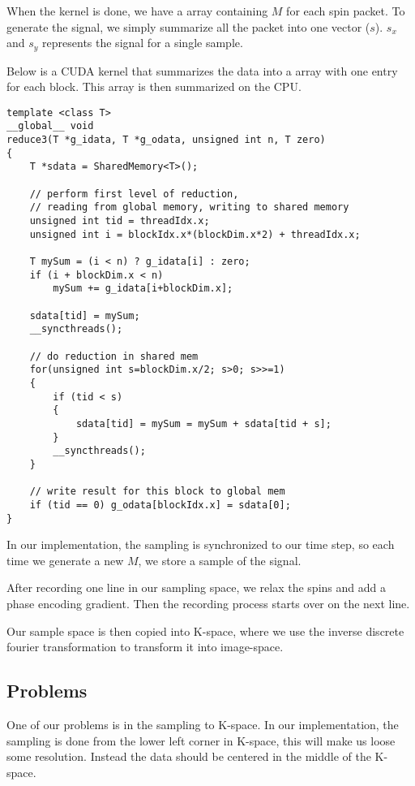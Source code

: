 When the kernel is done, we have a array containing $M$ for each spin
packet. To generate the signal, we simply summarize all the packet
into one vector ($s$). $s_x$ and $s_y$ represents the signal for a
single sample.

Below is a CUDA kernel that summarizes the data into a array with one
entry for each block. This array is then summarized on the CPU.

\begin{strip}
\begin{lstlisting}
template <class T>
__global__ void
reduce3(T *g_idata, T *g_odata, unsigned int n, T zero)
{
    T *sdata = SharedMemory<T>();

    // perform first level of reduction,
    // reading from global memory, writing to shared memory
    unsigned int tid = threadIdx.x;
    unsigned int i = blockIdx.x*(blockDim.x*2) + threadIdx.x;

    T mySum = (i < n) ? g_idata[i] : zero;
    if (i + blockDim.x < n) 
        mySum += g_idata[i+blockDim.x];  

    sdata[tid] = mySum;
    __syncthreads();

    // do reduction in shared mem
    for(unsigned int s=blockDim.x/2; s>0; s>>=1) 
    {
        if (tid < s) 
        {
            sdata[tid] = mySum = mySum + sdata[tid + s];
        }
        __syncthreads();
    }

    // write result for this block to global mem 
    if (tid == 0) g_odata[blockIdx.x] = sdata[0];
}
\end{lstlisting}  
\end{strip}

In our implementation, the sampling is synchronized to our time step,
so each time we generate a new $M$, we store a sample of the signal.

After recording one line in our sampling space, we relax the spins and
add a phase encoding gradient. Then the recording process starts over
on the next line.

Our sample space is then copied into K-space, where we use the
inverse discrete fourier transformation to transform it into image-space.

\subsection{Problems}

One of our problems is in the sampling to K-space. In our
implementation, the sampling is done from the lower left corner in
K-space, this will make us loose some resolution. Instead the data
should be centered in the middle of the K-space.



